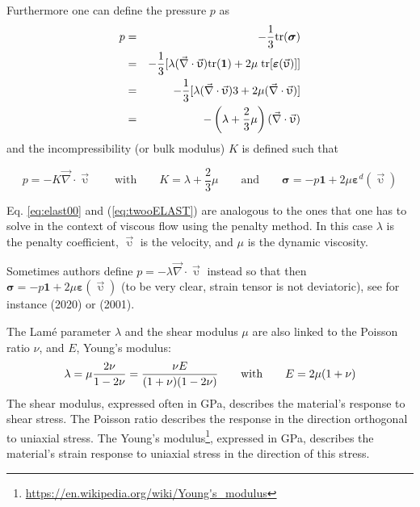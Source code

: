 Furthermore one can define the pressure $p$ as 
\begin{eqnarray}
p
&=&-\frac{1}{3} {\rm tr}({\bm \sigma}) \nonumber\\
&=& -\frac{1}{3} [ \lambda (\vec{\nabla}\cdot\vec{\upupsilon}) 
{{\rm tr}}({\bm 1}) 
+ 2 \mu \; {\rm tr}[{\bm \varepsilon}(\vec{\upupsilon})]] \nonumber\\
&=& -\frac{1}{3} [ \lambda (\vec{\nabla}\cdot\vec{\upupsilon})  3  
+ 2 \mu  (\vec{\nabla}\cdot\vec{\upupsilon}) ] \nonumber\\
&=& -\left( \lambda + \frac{2}{3} \mu \right) (\vec{\nabla}\cdot\vec{\upupsilon})  
\end{eqnarray}
and the incompressibility (or bulk modulus) $K$ is defined such that
\begin{mdframed}[backgroundcolor=blue!5]
\[
p=-K \vec{\nabla}\cdot\vec{\upupsilon} 
\qquad
\text{with}
\qquad
K=\lambda+\frac{2}{3}\mu
\qquad
\text{and}
\qquad
{\bm \sigma} = -p {\bm 1} + 2\mu {\bm \varepsilon}^d(\vec\upupsilon)
\]
\end{mdframed}

\begin{remark}
Eq. \eqref{eq:elast00} and (\ref{eq:twooELAST}) are analogous to the ones that one has to solve in the context of viscous flow using the penalty method. In this case $\lambda$ is the penalty coefficient, $\vec{\upupsilon}$ is the velocity, and $\mu$ is the dynamic viscosity.
\end{remark}

\begin{remark}
Sometimes authors define $p=-\lambda  \vec{\nabla}\cdot\vec{\upupsilon}$ instead so that then 
${\bm \sigma} = -p {\bm 1} + 2\mu {\bm \varepsilon}(\vec\upupsilon)$ (to
be very clear, strain tensor is not deviatoric),
see for instance \textcite{samb20} (2020) or \textcite{hala01} (2001).
\end{remark}






The Lam\'e parameter $\lambda$ and the shear modulus $\mu$ 
are also linked to the Poisson ratio $\nu$, 
and $E$, Young's modulus: 
\[
\lambda=\mu\frac{2\nu}{1-2\nu}
=\frac{\nu E}{(1+\nu)(1-2\nu)}
\quad\quad
{\rm with}
\quad\quad
E=2\mu(1+\nu)
\]
The shear modulus, expressed often in \si{\giga\pascal}, describes the material's response to shear stress. The Poisson ratio describes the response in the direction orthogonal to uniaxial stress. The Young's modulus\footnote{\url{https://en.wikipedia.org/wiki/Young's_modulus}}, expressed in \si{\giga\pascal}, describes the material's strain response to uniaxial stress in the 
direction of this stress.

